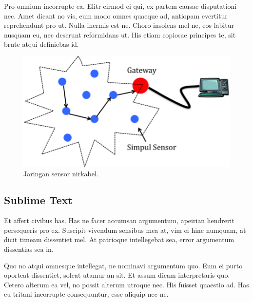     Pro omnium incorrupte ea. Elitr eirmod ei qui, ex partem causae disputationi nec. Amet dicant no vis, eum modo omnes quaeque ad, antiopam evertitur reprehendunt pro ut. Nulla inermis est ne. Choro insolens mel ne, eos labitur nusquam eu, nec deserunt reformidans ut. His etiam copiosae principes te, sit brute atqui definiebas id.


      \begin{figure}[H]
        \centering
          \includegraphics{images/wsn}
          \caption{Jaringan sensor nirkabel.}
          \label{wsn}
      \end{figure}


  \subsection{Sublime Text}
    Et affert civibus has. Has ne facer accumsan argumentum, apeirian hendrerit persequeris pro ex. Suscipit vivendum sensibus mea at, vim ei hinc numquam, at dicit timeam dissentiet mel. At patrioque intellegebat sea, error argumentum dissentias sea in.

    Quo no atqui omnesque intellegat, ne nominavi argumentum quo. Eum ei purto oporteat dissentiet, soleat utamur an sit. Et assum dicam interpretaris quo. Cetero alterum ea vel, no possit alterum utroque nec. His fuisset quaestio ad. Has eu tritani incorrupte consequuntur, esse aliquip nec ne.

